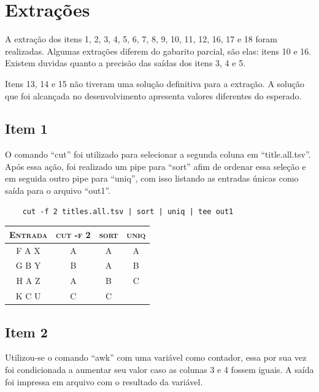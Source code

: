 \documentclass[12pt]{article}
\begin{document}
	\section{Extrações}
	
	A extração dos itens 1, 2, 3, 4, 5, 6, 7, 8, 9, 10, 11, 12, 16, 17 e 18 foram realizadas. Algumas extrações diferem do gabarito parcial, são elas: itens 10 e 16. Existem duvidas quanto a precisão das saídas dos itens 3, 4 e 5.
	
	Itens 13, 14 e 15 não tiveram uma solução definitiva para a extração. A solução que foi alcançada no desenvolvimento apresenta valores diferentes do esperado.
	
	\subsection*{Item 1}
	
	O comando ``cut'' foi utilizado para selecionar a segunda coluna em ``title.all.tsv''. Após essa ação, foi realizado um pipe para ``sort'' afim de ordenar essa seleção e em seguida outro pipe para ``uniq'', com isso listando as entradas únicas como saída para o arquivo ``out1''.
	
	\begin{verbatim}
	cut -f 2 titles.all.tsv | sort | uniq | tee out1 
	\end{verbatim}
	
	\begin{table}[!h]
		\begin{tabular}{ c c c c }
			\textsc{Entrada} & \textsc{cut -f 2} & \textsc{sort} & \textsc{uniq} \\ 
			\hline
			F A X & A & A & A \\ 
			G B Y & B & A & B \\
			H A Z & A & B & C \\
			K C U & C & C &   \\
		\end{tabular}
	\end{table}
	
	\subsection*{Item 2}
	
	Utilizou-se o comando ``awk'' com uma variável como contador, essa por sua vez foi condicionada a aumentar seu valor caso as colunas 3 e 4 fossem iguais. A saída foi impressa em arquivo com o resultado da variável.
	
\end{document}
